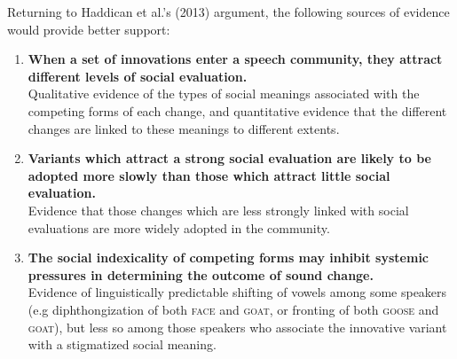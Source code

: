 \documentclass{article}
\begin{document}
Returning to Haddican et al.'s (2013) argument, the following sources of evidence would provide better support:
\begin{enumerate}[i]
\item{\textbf{When a set of innovations enter a speech community, they attract different levels of social evaluation.}
\\Qualitative evidence of the types of social meanings associated with the competing forms of each change, and quantitative evidence that the different changes are linked to these meanings to different extents.}
\item{\textbf{Variants which attract a strong social evaluation are likely to be adopted more slowly than those which attract little social evaluation.} 
\\Evidence that those changes which are less strongly linked with social evaluations are more widely adopted in the community.}
\item{\textbf{The social indexicality of competing forms may inhibit systemic pressures in determining the outcome of sound change.} 
\\Evidence of linguistically predictable shifting of vowels among some speakers (e.g diphthongization of both \textsc{face} and \textsc{goat}, or fronting of both \textsc{goose} and \textsc{goat}), but less so among those speakers who associate the innovative variant with a stigmatized social meaning.}
\end{enumerate}

\end{document}
